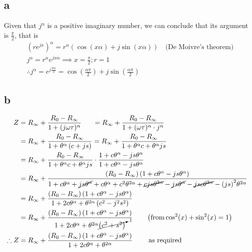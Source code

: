 \subsection{a}
Given that $j^\alpha$ is a positive imaginary number, we can conclude that its argument is $\frac{\pi}{2}$, that is
\begin{equation}
\begin{split}
	&{(r e^{jx})}^\alpha = r^\alpha \left( \cos(x\alpha) + j\sin(x\alpha) \right) \quad \text{(De Moivre's theorem)}\\
	&j^\alpha =r^\alpha e^{jx\alpha} \implies x=\frac{\pi}{2}; r = 1\\
	&\therefore j^\alpha = e^{ j\frac{\pi\alpha}{2} } = \cos\left(\frac{\alpha\pi}{2}\right) + j\sin\left(\frac{\alpha\pi}{2}\right)
\end{split}
\end{equation}
\subsection{b}
\begin{equation}
\begin{split}
	Z &= R_\infty + \frac{R_0 - R_\infty}{1 + (j\omega\tau)^\alpha} \quad  \ \ = R_\infty + \frac{
		R_0 - R_\infty
		}{
			1 + (\omega\tau)^\alpha \cdot j^\alpha
		} \\
	&= R_\infty + \frac{
		R_0 - R_\infty
		}{
			1 + \theta^\alpha  \left(c + js\right)
			}
	= R_\infty + \frac{
			R_0 - R_\infty
		}{
			1 + \theta^\alpha c + \theta^\alpha js
		} \\
	&= R_\infty + \frac{
			R_0 - R_\infty
		}{
			1 + \theta^\alpha c + \theta^\alpha js
		}
		\cdot \frac{
			1+c\theta^\alpha - js\theta^\alpha
		}{
			1+c\theta^\alpha - js\theta^\alpha
		} \\
	&= R_\infty + \frac{
			\left( R_0 - R_\infty \right) \left( 1+c\theta^\alpha - js\theta^\alpha \right)
		}{
			1 + c\theta^\alpha + \cancel{js\theta^\alpha} + c\theta^\alpha + c^2\theta^{2\alpha} + \cancel{cjs\theta^{2\alpha}} - \cancel{js\theta^\alpha} - \cancel{jsc\theta^{2\alpha}} - {(js)}^2\theta^{2\alpha}
		} \\
	&= R_\infty + \frac{
		\left( R_0 - R_\infty \right) \left( 1+c\theta^\alpha - js\theta^\alpha \right)
		}{
			1+ 2c\theta^\alpha + \theta^{2\alpha}\left( c^2 - j^2s^2 \right)
		} \\
	&=
		R_\infty + \frac{
		\left( R_0 - R_\infty \right) \left( 1+c\theta^\alpha - js\theta^\alpha \right)
		}{
			1+ 2c\theta^\alpha + \theta^{2\alpha}\cancelto{1}{\left( c^2 + s^2 \right)}
		}
		\quad \quad \left(
			\text{from} \cos^2(x) + \sin^2(x) = 1
		\right) \\
	\therefore Z &= R_\infty + \frac{
		\left( R_0 - R_\infty \right) \left( 1+c\theta^\alpha - js\theta^\alpha \right)
		}{
			1+ 2c\theta^\alpha + \theta^{2\alpha}
		}
	\quad \quad \text{ as required} 
\end{split}
\end{equation}
